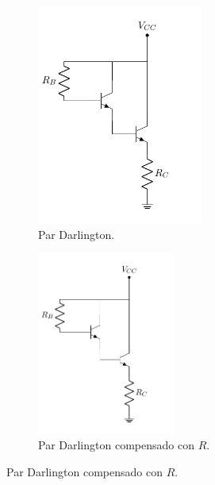 \begin{figure}[H]
\centering
\begin{subfigure}{.4\textwidth}
\centering
	\includegraphics[width=0.6\textwidth, page=1]{Imagenes/ParDarlington.pdf}
	\caption{Par Darlington.}
	\label{fig:pardar1}
\end{subfigure}
\begin{subfigure}{.5\textwidth}
\centering
	\includegraphics[width=0.5\textwidth, page=2]{Imagenes/ParDarlington.pdf}
	\caption{Par Darlington compensado con $R$.}
	\label{fig:pardar2}
\end{subfigure}


\end{figure}
